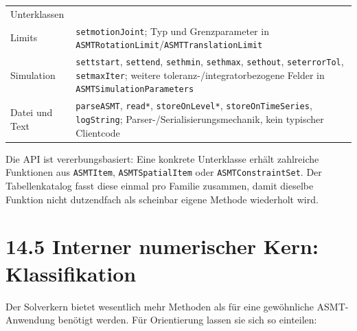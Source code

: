 \documentclass[
  12pt
]{book}
\begin{document}
\begin{longtable}[]{@{}
  >{\raggedright\arraybackslash}p{}
  >{\raggedright\arraybackslash}p{}@{}}
Unterklassen \\
Limits & \texttt{setmotionJoint}; Typ und Grenzparameter in
\texttt{ASMTRotationLimit}/\texttt{ASMTTranslationLimit} \\
Simulation & \texttt{settstart}, \texttt{settend}, \texttt{sethmin},
\texttt{sethmax}, \texttt{sethout}, \texttt{seterrorTol},
\texttt{setmaxIter}; weitere toleranz-/integratorbezogene Felder in
\texttt{ASMTSimulationParameters} \\
Datei und Text & \texttt{parseASMT}, \texttt{read*},
\texttt{storeOnLevel*}, \texttt{storeOnTimeSeries}, \texttt{logString};
Parser-/Serialisierungsmechanik, kein typischer Clientcode \\
\end{longtable}

Die API ist vererbungsbasiert: Eine konkrete Unterklasse erhält
zahlreiche Funktionen aus \texttt{ASMTItem}, \texttt{ASMTSpatialItem}
oder \texttt{ASMTConstraintSet}. Der Tabellenkatalog fasst diese einmal
pro Familie zusammen, damit dieselbe Funktion nicht dutzendfach als
scheinbar eigene Methode wiederholt wird.

\hypertarget{interner-numerischer-kern-klassifikation}{%
\section{\texorpdfstring{{14.5} Interner numerischer Kern:
Klassifikation}{14.5 Interner numerischer Kern: Klassifikation}}\label{interner-numerischer-kern-klassifikation}}

Der Solverkern bietet wesentlich mehr Methoden als für eine gewöhnliche
ASMT-Anwendung benötigt werden. Für Orientierung lassen sie sich so
einteilen:
\end{document}
